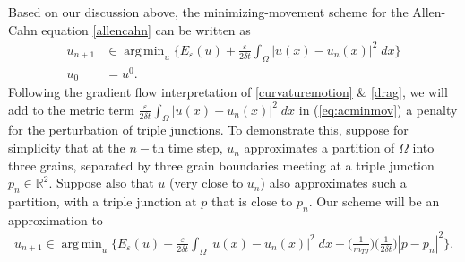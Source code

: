 \documentclass{article}
\theoremstyle{plain}
\theoremstyle{definition}
\theoremstyle{remark}
\newcommand{\eps}{\varepsilon}
\DeclareMathOperator*{\argmin}{arg\,min}
\begin{document}
Based on our discussion above, the minimizing-movement scheme for the Allen-Cahn equation \eqref{allencahn} can be written as
\begin{equation}\label{eq:acminmov}
\begin{split}
    u_{n+1} &\in \argmin_{u} \bigg\{ E_\eps(u) + \frac{\eps}{2\delta t}\int_\Omega |u(x)-u_n(x)|^2\;dx\bigg\}\\
    u_0 &= u^0.
\end{split}
\end{equation}
Following the gradient flow interpretation of \eqref{curvaturemotion} \& \eqref{drag}, we will add to the metric term $\frac{\eps}{2\delta t}\int_\Omega |u(x)-u_n(x)|^2\;dx$ in (\ref{eq:acminmov}) a penalty for the perturbation of triple junctions.
To demonstrate this, suppose for simplicity that at the $n-$th time step, $u_n$ approximates a partition of $\Omega$ into three grains, separated by three grain boundaries meeting at a triple junction $p_n \in \mathbb{R}^2$.
Suppose also that $u$ (very close to $u_n$) also approximates such a partition, with a triple junction at $p$ that is close to $p_n$. 
Our scheme will be an approximation to
\begin{align}\label{min_mvmt_drag}
    u_{n+1} \in \argmin_{u} \bigg\{ E_\eps(u) + \frac{\eps}{2\delta t}\int_\Omega |u(x)-u_n(x)|^2\;dx + \bigg(\frac{1}{m_{TJ}}\bigg)\bigg(\frac{1}{2\delta t}\bigg)|p-p_n|^2 \bigg\}.
\end{align}
\end{document}

